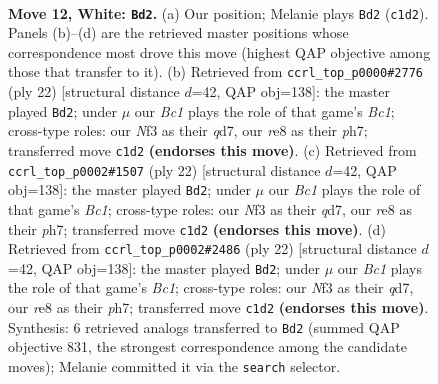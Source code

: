 \documentclass[11pt]{article}
\begin{document}
\clearpage

\begin{figure}[p]\centering
\begin{subfigure}{0.46\textwidth}\centering
\resizebox{\linewidth}{!}{%
\newchessgame
\chessboard[
  setfen={r2qr1k1/1bp1bpp1/p1np1n1p/1p2p3/4P3/PBNP1N1P/1PP2PP1/R1BQR1K1 w - - 1 12},
  showmover=false,
  pgfstyle=straightmove, color=movearrow, markmove={c1-d2}
]}
\caption{}
\end{subfigure}\hfill
\begin{subfigure}{0.46\textwidth}\centering
\resizebox{\linewidth}{!}{%
\newchessgame
\chessboard[
  setfen={r3r1k1/1bpqbppp/p1np1n2/1p2p3/4P3/PBNP1N1P/1PP2PP1/R1BQR1K1 w - - 1 12},
  showmover=false,
  pgfstyle=straightmove, color=movearrow, markmove={c1-d2}
]}
\caption{}
\end{subfigure}
\\[4pt]
\begin{subfigure}{0.46\textwidth}\centering
\resizebox{\linewidth}{!}{%
\newchessgame
\chessboard[
  setfen={r3r1k1/1bpqbppp/p1np1n2/1p2p3/4P3/PBNP1N1P/1PP2PP1/R1BQR1K1 w - - 1 12},
  showmover=false,
  pgfstyle=straightmove, color=movearrow, markmove={c1-d2}
]}
\caption{}
\end{subfigure}\hfill
\begin{subfigure}{0.46\textwidth}\centering
\resizebox{\linewidth}{!}{%
\newchessgame
\chessboard[
  setfen={r3r1k1/1bpqbppp/p1np1n2/1p2p3/4P3/PBNP1N1P/1PP2PP1/R1BQR1K1 w - - 3 12},
  showmover=false,
  pgfstyle=straightmove, color=movearrow, markmove={c1-d2}
]}
\caption{}
\end{subfigure}
\caption{\textbf{Move 12, White: \texttt{Bd2}.} (a) Our position; Melanie plays \texttt{Bd2} (\texttt{c1d2}). Panels (b)--(d) are the retrieved master positions whose correspondence most drove this move (highest QAP objective among those that transfer to it). (b) Retrieved from \texttt{ccrl\_top\_p0000\#2776} (ply 22) [structural distance $d$=42, QAP obj=138]: the master played \texttt{Bd2}; under $\mu$ our \emph{Bc1} plays the role of that game's \emph{Bc1}; cross-type roles: our \emph{N}f3 as their \emph{q}d7, our \emph{r}e8 as their \emph{p}h7; transferred move \texttt{c1d2} \textbf{(endorses this move)}. (c) Retrieved from \texttt{ccrl\_top\_p0002\#1507} (ply 22) [structural distance $d$=42, QAP obj=138]: the master played \texttt{Bd2}; under $\mu$ our \emph{Bc1} plays the role of that game's \emph{Bc1}; cross-type roles: our \emph{N}f3 as their \emph{q}d7, our \emph{r}e8 as their \emph{p}h7; transferred move \texttt{c1d2} \textbf{(endorses this move)}. (d) Retrieved from \texttt{ccrl\_top\_p0002\#2486} (ply 22) [structural distance $d$=42, QAP obj=138]: the master played \texttt{Bd2}; under $\mu$ our \emph{Bc1} plays the role of that game's \emph{Bc1}; cross-type roles: our \emph{N}f3 as their \emph{q}d7, our \emph{r}e8 as their \emph{p}h7; transferred move \texttt{c1d2} \textbf{(endorses this move)}. Synthesis: 6 retrieved analogs transferred to \texttt{Bd2} (summed QAP objective 831, the strongest correspondence among the candidate moves); Melanie committed it via the \texttt{search} selector.}
\label{fig:thought-m22}
\end{figure}
\end{document}
